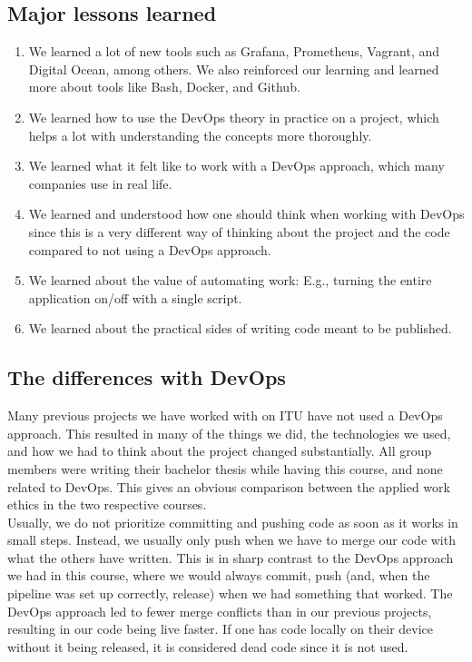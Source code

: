 \subsection{Major lessons learned}
\begin{enumerate}
    \item We learned a lot of new tools such as Grafana, Prometheus, Vagrant, and Digital Ocean, among others. We also reinforced our learning and learned more about tools like Bash, Docker, and Github.
    \item We learned how to use the DevOps theory in practice on a project, which helps a lot with understanding the concepts more thoroughly.
    \item We learned what it felt like to work with a DevOps approach, which many companies use in real life.
    \item We learned and understood how one should think when working with DevOps since this is a very different way of thinking about the project and the code compared to not using a DevOps approach.
    \item We learned about the value of automating work: E.g., turning the entire application on/off with a single script.
    \item We learned about the practical sides of writing code meant to be published. 
\end{enumerate}

\subsection{The differences with DevOps}
Many previous projects we have worked with on ITU have not used a DevOps approach. This resulted in many of the things we did, the technologies we used, and how we had to think about the project changed substantially. All group members were writing their bachelor thesis while having this course, and none related to DevOps. This gives an obvious comparison between the applied work ethics in the two respective courses.  \\

Usually, we do not prioritize committing and pushing code as soon as it works in small steps. Instead, we usually only push when we have to merge our code with what the others have written. This is in sharp contrast to the DevOps approach we had in this course, where we would always commit, push (and, when the pipeline was set up correctly, release) when we had something that worked. The DevOps approach led to fewer merge conflicts than in our previous projects, resulting in our code being live faster. If one has code locally on their device without it being released, it is considered dead code since it is not used.